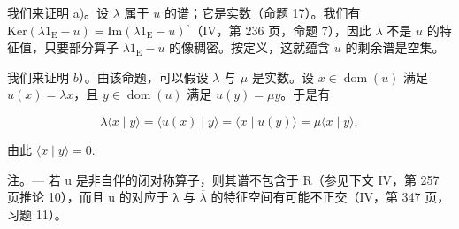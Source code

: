 我们来证明 a)。设 \(\lambda\) 属于 \(u\) 的谱；它是实数（命题 17）。我们有 \(\mathrm{Ker}(\lambda 1_{\mathrm{E}} - u) = \mathrm{Im}(\lambda 1_{\mathrm{E}} - u)^{\circ}\)（IV，第 236 页，命题 7），因此 \(\lambda\) 不是 \(u\) 的特征值，只要部分算子 \(\lambda 1_{\mathrm{E}} - u\) 的像稠密。按定义，这就蕴含 \(u\) 的剩余谱是空集。

我们来证明 \(b\)）。由该命题，可以假设 \(\lambda\) 与 \(\mu\) 是实数。设 \(x \in \operatorname{dom}(u)\) 满足 \(u(x) = \lambda x\)，且 \(y \in \operatorname{dom}(u)\) 满足 \(u(y) = \mu y\)。于是有

\[
\lambda \langle x \mid y \rangle = \langle u (x) \mid y \rangle = \langle x \mid u (y) \rangle = \mu \langle x \mid y \rangle ,
\]

由此 \(\langle x \mid y \rangle = 0.\)

注。--- 若 u 是非自伴的闭对称算子，则其谱不包含于 R（参见下文 IV，第 257 页推论 10），而且 u 的对应于 λ 与 \(\overline{\lambda}\) 的特征空间有可能不正交（IV，第 347 页，习题 11）。

